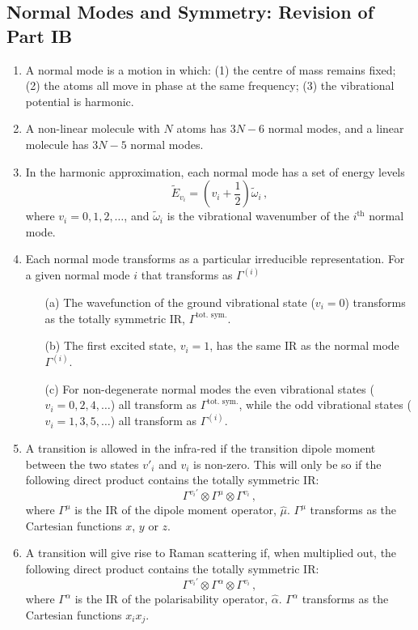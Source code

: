 \documentclass{article}
\theoremstyle{plain}\theoremheaderfont{\normalfont\itshape}\theorembodyfont{\rmfamily}\theoremseparator{.}\newtheorem*{rem}{Remark}\newtheorem*{ex}{Example}\newtheorem*{proof}{Proof}\newtheorem*{altp}{Alternative proof}
\theoremstyle{plain}\theoremheaderfont{\normalfont\bfseries}\theorembodyfont{\rmfamily}\theoremseparator{.}\newtheorem{thm}{Theorem}[section]\newtheorem{lem}[thm]{Lemma}\newtheorem{prop}[thm]{Proposition}\newtheorem*{cor}{Corollary}\newtheorem{defn}[thm]{Definition}\newtheorem{clm}[thm]{Claim}\newtheorem{clminproof}{Claim}\newtheorem{pos}{Postulate}[section]
\theoremstyle{break}\theoremheaderfont{\normalfont\itshape}\theorembodyfont{\rmfamily}\theoremseparator{.\medskip}\newtheorem*{proofskip}{Proof}\newtheorem*{exs}{Examples}\newtheorem*{rems}{Remarks}
\theoremstyle{break}\theoremheaderfont{\normalfont\bfseries}\theorembodyfont{\rmfamily}\theoremseparator{.\medskip}\newtheorem{lemskip}[thm]{Lemma}\newtheorem{defnskip}[thm]{Definition}\newtheorem{propskip}[thm]{Proposition}\newtheorem{thmskip}[thm]{Theorem}
\numberwithin{equation}{section}
\begin{document}
    \subsection{Normal Modes and Symmetry: Revision of Part IB}
    \begin{enumerate}[topsep=0pt,label=(\roman*)]
        \item  A normal mode is a motion in which: (1) the centre of mass remains fixed; (2) the atoms all move in phase at the same frequency; (3) the vibrational potential is harmonic.
        \item A non-linear molecule with \(N\) atoms has \(3N-6\) normal modes, and a linear molecule has \(3N-5\) normal modes.
        \item In the harmonic approximation, each normal mode has a set of energy levels
        \begin{equation}
            \tilde{E}_{v_i}=\left(v_i+\frac{1}{2}\right)\tilde{\omega}_i\,,
        \end{equation}
        where \(v_i=0,1,2,\dots\), and \(\tilde{\omega}_i\) is the vibrational wavenumber of the \(i^{\text{th}}\) normal mode.
        \item Each normal mode transforms as a particular irreducible representation. For a given normal mode \(i\) that transforms as \(\Gamma^{(i)}\)
        \begin{enumerate}[topsep=0pt]
            \item[(a)] The wavefunction of the ground vibrational state (\(v_i=0\)) transforms as the totally symmetric IR, \(\Gamma^{\text{tot. sym.}}\).
            \item[(b)] The first excited state, \(v_i=1\), has the same IR as the normal mode \(\Gamma^{(i)}\).
            \item[(c)] For non-degenerate normal modes the even vibrational states (\(v_i=0,2,4,\dots\)) all transform as \(\Gamma^{\text{tot. sym.}}\), while the odd vibrational states (\(v_i=1,3,5,\dots\)) all transform as \(\Gamma^{(i)}\).
        \end{enumerate}
        \item A transition is allowed in the infra-red if the transition dipole moment between the two states \(v'_i\) and \(v_i\) is non-zero. This will only be so if the following direct product contains the totally symmetric IR:
        \begin{equation}
            \Gamma^{v_i'}\otimes\Gamma^\mu\otimes\Gamma^{v_i}\,,
        \end{equation}
        where \(\Gamma^\mu\) is the IR of the dipole moment operator, \(\hat{\mu}\). \(\Gamma^\mu\) transforms as the Cartesian functions \(x\), \(y\) or \(z\).
        \item A transition will give rise to Raman scattering if, when multiplied out, the following direct product contains the totally symmetric IR:
        \begin{equation}
            \Gamma^{v_i'}\otimes\Gamma^\alpha\otimes\Gamma^{v_i}\,,
        \end{equation}
        where \(\Gamma^\alpha\) is the IR of the polarisability operator, \(\hat{\alpha}\). \(\Gamma^\alpha\) transforms as the Cartesian functions \(x_ix_j\).
    \end{enumerate}
\end{document}
